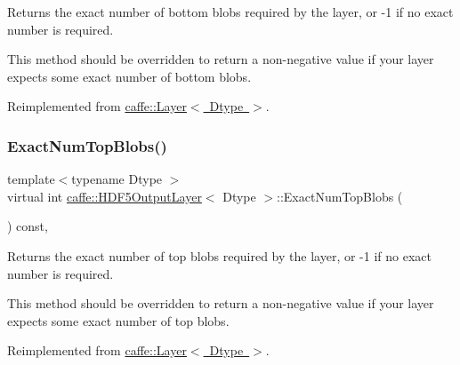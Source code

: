Returns the exact number of bottom blobs required by the layer, or -\/1 if no exact number is required. 

This method should be overridden to return a non-\/negative value if your layer expects some exact number of bottom blobs. 

Reimplemented from \mbox{\hyperlink{classcaffe_1_1_layer_a8e5ee0494d85f5f55fc4396537cbc60f}{caffe\+::\+Layer$<$ Dtype $>$}}.

\mbox{\label{classcaffe_1_1_h_d_f5_output_layer_ad11b8da0a6217a0f9a63789b360b1c99}} 
\subsubsection{\texorpdfstring{Exact\+Num\+Top\+Blobs()}{ExactNumTopBlobs()}\hspace{0.1cm}{\footnotesize\ttfamily [1/2]}}
{\footnotesize\ttfamily template$<$typename Dtype $>$ \\
virtual int \mbox{\hyperlink{classcaffe_1_1_h_d_f5_output_layer}{caffe\+::\+H\+D\+F5\+Output\+Layer}}$<$ Dtype $>$\+::Exact\+Num\+Top\+Blobs (\begin{DoxyParamCaption}{ }\end{DoxyParamCaption}) const\hspace{0.3cm}{\ttfamily [inline]}, {\ttfamily [virtual]}}



Returns the exact number of top blobs required by the layer, or -\/1 if no exact number is required. 

This method should be overridden to return a non-\/negative value if your layer expects some exact number of top blobs. 

Reimplemented from \mbox{\hyperlink{classcaffe_1_1_layer_a64e2ca72c719e4b2f1f9216ccfb0d37f}{caffe\+::\+Layer$<$ Dtype $>$}}.

\mbox{\label{classcaffe_1_1_h_d_f5_output_layer_ad11b8da0a6217a0f9a63789b360b1c99}} 

